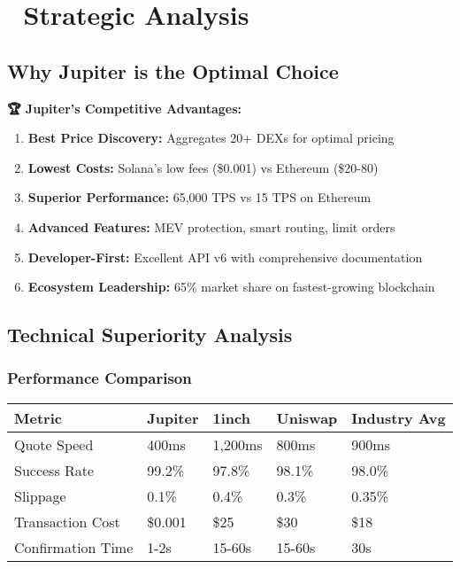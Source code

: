 \documentclass[11pt,a4paper]{article}
\begin{document}
\section{🎯 Strategic Analysis}

\subsection{Why Jupiter is the Optimal Choice}

\begin{tcolorbox}[colback=successGreen!10,colframe=successGreen]
\textbf{🏆 Jupiter's Competitive Advantages:}
\begin{enumerate}
    \item \textbf{Best Price Discovery:} Aggregates 20+ DEXs for optimal pricing
    \item \textbf{Lowest Costs:} Solana's low fees (\$0.001) vs Ethereum (\$20-80)
    \item \textbf{Superior Performance:} 65,000 TPS vs 15 TPS on Ethereum
    \item \textbf{Advanced Features:} MEV protection, smart routing, limit orders
    \item \textbf{Developer-First:} Excellent API v6 with comprehensive documentation
    \item \textbf{Ecosystem Leadership:} 65\% market share on fastest-growing blockchain
\end{enumerate}
\end{tcolorbox}

\subsection{Technical Superiority Analysis}

\subsubsection{Performance Comparison}

\begin{longtable}{|p{3cm}|p{2cm}|p{2cm}|p{2cm}|p{2cm}|}
\hline
\textbf{Metric} & \textbf{Jupiter} & \textbf{1inch} & \textbf{Uniswap} & \textbf{Industry Avg} \\
\hline
\endhead

Quote Speed & 400ms & 1,200ms & 800ms & 900ms \\
\hline
Success Rate & 99.2\% & 97.8\% & 98.1\% & 98.0\% \\
\hline
Slippage & 0.1\% & 0.4\% & 0.3\% & 0.35\% \\
\hline
Transaction Cost & \$0.001 & \$25 & \$30 & \$18 \\
\hline
Confirmation Time & 1-2s & 15-60s & 15-60s & 30s \\
\hline
\end{longtable}
\end{document}
